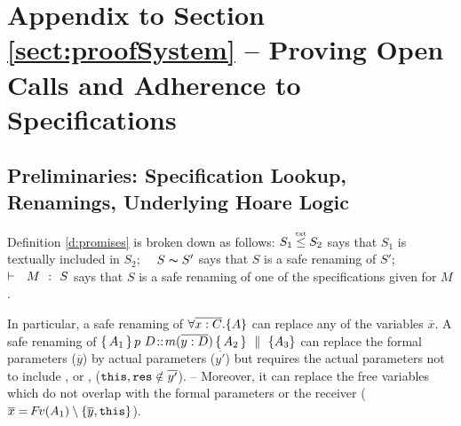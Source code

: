 \section{Appendix to Section \ref{sect:proofSystem} -- Proving Open Calls and Adherence to \SpecLang Specifications} \label{app:proof}


\subsection{Preliminaries: Specification Lookup,  Renamings, Underlying Hoare Logic}

Definition \ref{d:promises} is broken down as follows:  $S_1 \txtin  S_2$ says that $S_1$ is textually included in $S_2$; \ \ $S \thicksim S'$ says that $S$ is a safe renaming of $S'$; \ \   ${\vdash \ \ M\ \ \mathbf{:}\ \ S}$ says that $S$ is a safe renaming of one of the specifications given for $M$. 
 
In particular, a safe renaming of  ${ \forall {\overline {x:C}}.{{\{}}{A}{{\}}}  }$ can replace any of the variables $\overline x$.  
A safe renaming  of ${\mprepostN{A_1}{p\ D}{m}{y}{D}{A_2} {A_3}}$  can replace  the formal parameters ($\overline y$) by actual parameters  ($\overline {y'}$) but requires the actual parameters  not to include , or , (\ie $\mbox{\normalfont{\texttt{this}}}, \mbox{\normalfont{\texttt{res}}}\notin \overline{y'}$). -- %
Moreover, it can replace  the free variables which do not overlap with the formal parameters or the receiver ( $\overline{x}={\hspace{-1pt}F\hspace{-1pt}}v(A_1)\setminus\{{\overline y},\mbox{\normalfont{\texttt{this}}}\}$).

